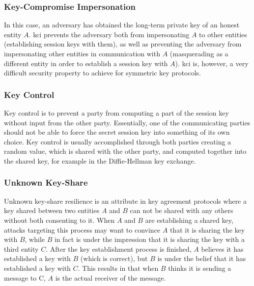 \subsubsection{Key-Compromise Impersonation}

In this case, an adversary has obtained the long-term private key of an honest entity $A$. \gls{kci} prevents the adversary both from impersonating $A$ to other entities (establishing session keys with them), as well as preventing the adversary from impersonating other entities in communication with $A$ (masquerading as a different entity in order to establish a session key with $A$). \gls{kci} is, however, a very difficult security property to achieve for symmetric key protocols.




\subsubsection{Key Control}

Key control is to prevent a party from computing a part of the session key without input from the other party. Essentially, one of the communicating parties should not be able to force the secret session key into something of its own choice. Key control is usually accomplished through both parties creating a random value, which is shared with the other party, and computed together into the shared key, for example in the Diffie-Hellman key exchange.

\subsubsection{Unknown Key-Share}

Unknown key-share resilience is an attribute in key agreement protocols where a key shared between two entities $A$ and $B$ can not be shared with any others without both consenting to it. When $A$ and $B$ are establishing a shared key, attacks targeting this process may want to convince $A$ that it is sharing the key with $B$, while $B$ in fact is under the impression that it is sharing the key with a third entity $C$. After the key establishment process is finished, $A$ believes it has established a key with $B$ (which is correct), but $B$ is under the belief that it has established a key with $C$. This results in that when $B$ thinks it is sending a message to C, $A$ is the actual receiver of the message.



